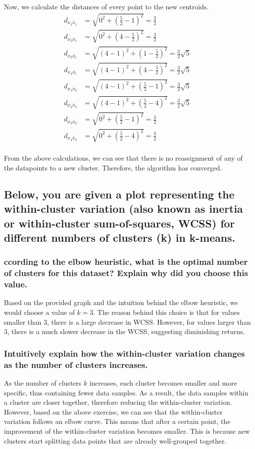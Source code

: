\documentclass{article}
\begin{document}
Now, we calculate the distances of every point to the new centroids.
\begin{equation}
  \begin{aligned}
    d_{x_1\bar{x}_1} &= \sqrt{0^2 + (\frac{5}{2} - 1)^2} = \frac{3}{2} \\
    d_{x_2\bar{x}_1} &= \sqrt{0^2 + (4 - \frac{5}{2})^2} = \frac{3}{2} \\
    d_{x_3\bar{x}_1} &= \sqrt{(4 - 1)^2 + (1 - \frac{5}{2})^2} = \frac{3}{2}\sqrt{5} \\
    d_{x_4\bar{x}_1} &= \sqrt{(4 - 1)^2 + (4 - \frac{5}{2})^2} = \frac{3}{2}\sqrt{5} \\
    d_{x_1\bar{x}_2} &= \sqrt{(4 - 1)^2 + (\frac{5}{2} - 1)^2} = \frac{3}{2}\sqrt{5} \\
    d_{x_2\bar{x}_2} &= \sqrt{(4 - 1)^2 + (\frac{5}{2} - 4)^2} = \frac{3}{2}\sqrt{5} \\
    d_{x_3\bar{x}_2} &= \sqrt{0^2 + (\frac{5}{2} - 1)^2} = \frac{3}{2} \\
    d_{x_4\bar{x}_2} &= \sqrt{0^2 + (\frac{5}{2} - 4)^2} = \frac{3}{2} \\
  \end{aligned}
\end{equation}

From the above calculations, we can see that there is no reassignment of any of the datapoints to a new cluster. Therefore, the algorithm has converged.

\subsection{Below, you are given a plot representing the within-cluster variation (also known as inertia or within-cluster sum-of-squares, WCSS) for different numbers of clusters (k) in k-means.}
\subsubsection{ccording to the elbow heuristic, what is the optimal number of clusters for this dataset? Explain why did you choose this value.}
Based on the provided graph and the intuition behind the elbow heuristic, we would choose a value of $k = 3$. The reason behind this choice is that for values smaller than 3, there is a large decrease in WCSS. However, for values larger than 3, there is a much slower decrease in the WCSS, suggesting diminishing returns.

\subsubsection{Intuitively explain how the within-cluster variation changes as the number of clusters increases.}  
As the number of clusters $k$ increases, each cluster becomes smaller and more specific, thus containing fewer data samples. As a result, the data samples within a cluster are closer together, therefore reducing the within-cluster variation. However, based on the above exercise, we can see that the within-cluster variation follows an elbow curve. This means that after a certain point, the improvement of the within-cluster variation becomes smaller. This is because new clusters start splitting data points that are already well-grouped together.
\end{document}
